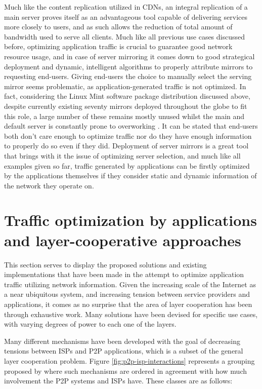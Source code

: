     Much like the content replication utilized in CDNs, an integral replication of a main server proves itself as an advantageous tool capable of delivering services more closely to users, and as such allows the reduction of total amount of bandwidth used to serve all clients.
    Much like all previous use cases discussed before, optimizing application traffic is crucial to guarantee good network resource usage, and in case of server mirroring it comes down to good strategical deployment and dynamic, intelligent algorithms to properly attribute mirrors to requesting end-users.
    Giving end-users the choice to manually select the serving mirror seems problematic, as application-generated traffic is not optimized.
    In fact, considering the Linux Mint software package distribution discussed above, despite currently existing seventy mirrors deployed throughout the globe to fit this role, a large number of these remains mostly unused whilst the main and default server is constantly prone to overworking \cite{mint-article}.
    It can be stated that end-users both don't care enough to optimize traffic nor do they have enough information to properly do so even if they did.
    Deployment of server mirrors is a great tool that brings with it the issue of optimizing server selection, and much like all examples given so far, traffic generated by applications can be firstly optimized by the applications themselves if they consider static and dynamic information of the network they operate on.

\section{Traffic optimization by applications and layer-cooperative approaches}

    This section serves to display the proposed solutions and existing implementations that have been made in the attempt to optimize application traffic utilizing network information.
    Given the increasing scale of the Internet as a near ubiquitous system, and increasing tension between service providers and applications, it comes as no surprise that the area of layer cooperation has been through exhaustive work.
    Many solutions have been devised for specific use cases, with varying degrees of power to each one of the layers.

    Many different mechanisms have been developed with the goal of decreasing tensions between ISPs and P2P applications, which is a subset of the general layer cooperation problem.
    Figure \ref{fig:p2p-isp-interactions} represents a grouping proposed by \cite{dan-Commag10} where such mechanisms are ordered in agreement with how much involvement the P2P systems and ISPs have. These classes are as follows:

